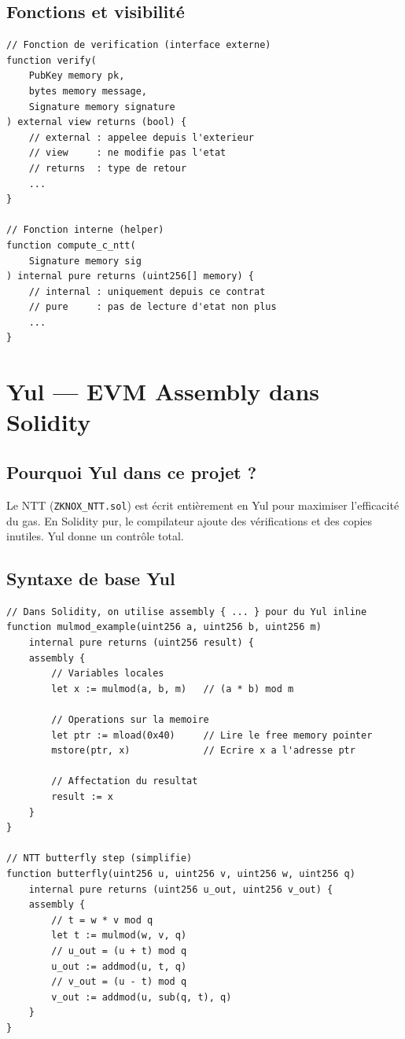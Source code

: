 \documentclass[12pt, a4paper]{article}
\begin{document}
\subsection{Fonctions et visibilité}

\begin{lstlisting}[style=solidity]
// Fonction de verification (interface externe)
function verify(
    PubKey memory pk,
    bytes memory message,
    Signature memory signature
) external view returns (bool) {
    // external : appelee depuis l'exterieur
    // view     : ne modifie pas l'etat
    // returns  : type de retour
    ...
}

// Fonction interne (helper)
function compute_c_ntt(
    Signature memory sig
) internal pure returns (uint256[] memory) {
    // internal : uniquement depuis ce contrat
    // pure     : pas de lecture d'etat non plus
    ...
}
\end{lstlisting}

\section{Yul --- EVM Assembly dans Solidity}

\subsection{Pourquoi Yul dans ce projet ?}

Le NTT (\texttt{ZKNOX\_NTT.sol}) est écrit entièrement en Yul pour
maximiser l'efficacité du gas. En Solidity pur, le compilateur ajoute
des vérifications et des copies inutiles. Yul donne un contrôle total.

\subsection{Syntaxe de base Yul}

\begin{lstlisting}[style=solidity]
// Dans Solidity, on utilise assembly { ... } pour du Yul inline
function mulmod_example(uint256 a, uint256 b, uint256 m)
    internal pure returns (uint256 result) {
    assembly {
        // Variables locales
        let x := mulmod(a, b, m)   // (a * b) mod m

        // Operations sur la memoire
        let ptr := mload(0x40)     // Lire le free memory pointer
        mstore(ptr, x)             // Ecrire x a l'adresse ptr

        // Affectation du resultat
        result := x
    }
}

// NTT butterfly step (simplifie)
function butterfly(uint256 u, uint256 v, uint256 w, uint256 q)
    internal pure returns (uint256 u_out, uint256 v_out) {
    assembly {
        // t = w * v mod q
        let t := mulmod(w, v, q)
        // u_out = (u + t) mod q
        u_out := addmod(u, t, q)
        // v_out = (u - t) mod q
        v_out := addmod(u, sub(q, t), q)
    }
}
\end{lstlisting}
\end{document}

